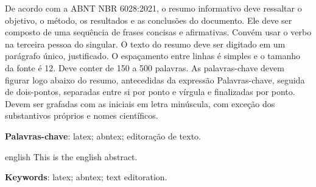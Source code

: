
\begin{resumo}
 De acordo com a ABNT NBR 6028:2021, o resumo informativo deve ressaltar o objetivo, o método, os resultados e as conclusões do documento. Ele deve ser composto de uma sequência de frases concisas e afirmativas. Convém usar o verbo na terceira pessoa do singular. O texto do resumo deve ser digitado em um parágrafo único, justificado. O espaçamento entre linhas é simples e o tamanho da fonte é 12. Deve conter de 150 a 500 palavras. As palavras-chave devem figurar logo abaixo do resumo, antecedidas da expressão Palavras-chave, seguida de dois-pontos, separadas entre si por ponto e vírgula e finalizadas por ponto. Devem ser grafadas com as iniciais em letra minúscula, com exceção dos substantivos próprios e nomes científicos.
 
\textbf{Palavras-chave}: latex; abntex; editoração de texto.

\end{resumo}

\begin{resumo}[Abstract]
 \begin{otherlanguage*}{english}
   This is the english abstract.

   \vspace{\onelineskip}
 
   \noindent 
   \textbf{Keywords}: latex; abntex; text editoration.
 \end{otherlanguage*}
\end{resumo}


 

  
